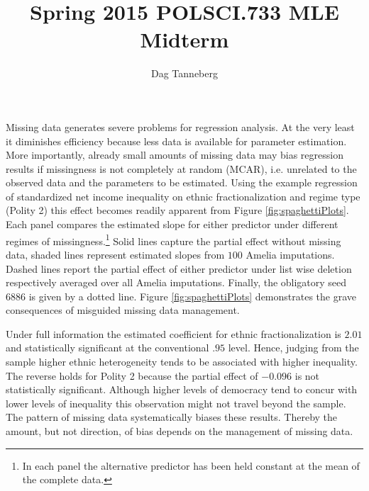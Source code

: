 \documentclass{scrartcl}\usepackage[]{graphicx}\usepackage[]{color}
\title{Spring 2015 POLSCI.733 MLE Midterm}
\author{Dag Tanneberg}
\date{}
\begin{document}
 





\maketitle 
\thispagestyle{scrheadings} 


Missing data generates severe problems for regression
analysis. At the very least it diminishes efficiency because
less data is available for parameter estimation. More
importantly, already small amounts of missing data may bias
regression results if missingness is not completely at
random (MCAR), i.e. unrelated to the observed data and the
parameters to be estimated. Using the example regression of
standardized net income inequality on ethnic
fractionalization and regime type (Polity 2) this effect
becomes readily apparent from Figure
\ref{fig:spaghettiPlots}. Each panel compares the estimated
slope for either predictor under different regimes of
missingness.\footnote{In each panel the alternative
predictor has been held constant at the mean of the complete
data.} Solid lines capture the partial effect without
missing data, shaded lines represent estimated slopes from
$100$ Amelia  imputations. Dashed lines report the partial
effect of either  predictor under list wise deletion
respectively averaged over all Amelia imputations. Finally,
the obligatory seed $6886$ is given by a dotted line. Figure
\ref{fig:spaghettiPlots} demonstrates the grave consequences
of misguided missing data management.


Under full information the estimated coefficient for ethnic
fractionalization is $2.01$ and statistically significant at
the conventional $.95$ level. Hence, judging from the sample
higher ethnic heterogeneity tends to be associated with
higher inequality. The reverse holds for Polity 2 because
the partial effect of $-0.096$ is not statistically
significant. Although higher levels of democracy tend to
concur with lower levels of inequality this observation
might not travel beyond the sample. The pattern of missing
data systematically biases these results. Thereby the
amount, but not direction, of bias depends on the management
of missing data.
\end{document}
